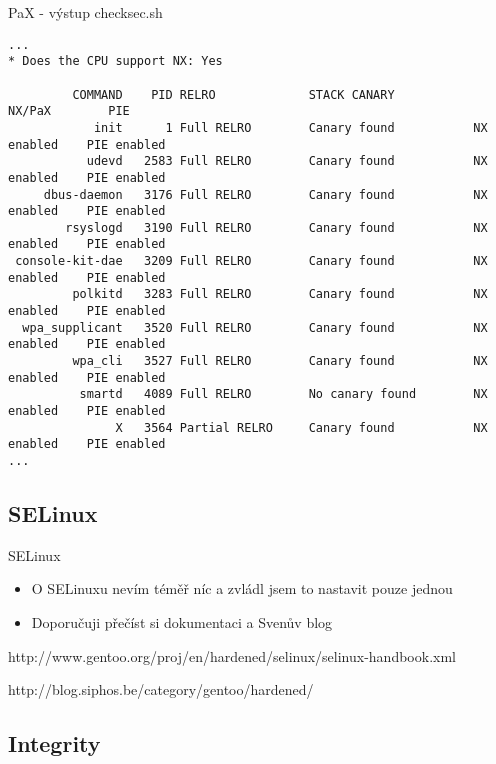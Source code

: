 \documentclass{beamer}
\begin{document}
\begin{frame}[fragile]{PaX - výstup checksec.sh}
	\begin{tiny}
	\begin{verbatim}
...
* Does the CPU support NX: Yes

         COMMAND    PID RELRO             STACK CANARY           NX/PaX        PIE
            init      1 Full RELRO        Canary found           NX enabled    PIE enabled
           udevd   2583 Full RELRO        Canary found           NX enabled    PIE enabled
     dbus-daemon   3176 Full RELRO        Canary found           NX enabled    PIE enabled
        rsyslogd   3190 Full RELRO        Canary found           NX enabled    PIE enabled
 console-kit-dae   3209 Full RELRO        Canary found           NX enabled    PIE enabled
         polkitd   3283 Full RELRO        Canary found           NX enabled    PIE enabled
  wpa_supplicant   3520 Full RELRO        Canary found           NX enabled    PIE enabled
         wpa_cli   3527 Full RELRO        Canary found           NX enabled    PIE enabled
          smartd   4089 Full RELRO        No canary found        NX enabled    PIE enabled
               X   3564 Partial RELRO     Canary found           NX enabled    PIE enabled
...
	\end{verbatim}
	\end{tiny}
\end{frame}

\subsection{SELinux}

\begin{frame}{SELinux}
	\begin{itemize}
		\item O SELinuxu nevím téměř níc a zvládl jsem to nastavit pouze jednou
		\item Doporučuji přečíst si dokumentaci a Svenův blog
	\end{itemize}
	\begin{center}http://www.gentoo.org/proj/en/hardened/selinux/selinux-handbook.xml\end{center}
	\begin{center}http://blog.siphos.be/category/gentoo/hardened/\end{center}
\end{frame}

\subsection{Integrity}
\end{document}
